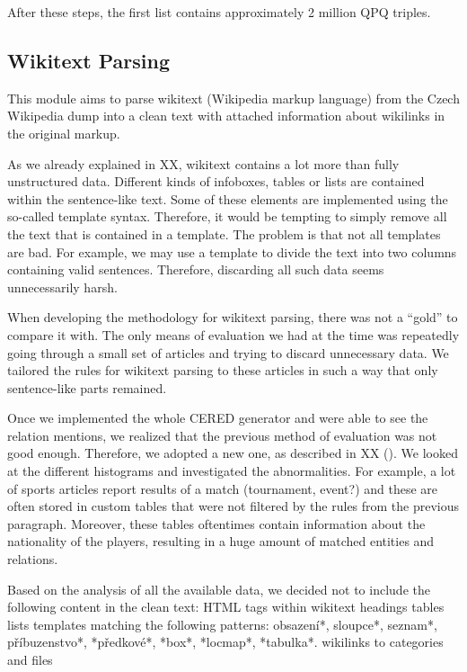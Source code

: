 After these steps, the first list contains approximately 2 million QPQ triples.

\subsection{Wikitext Parsing}

\label{sec:wikiperia_parsing_implementation}

This module aims to parse wikitext (Wikipedia markup language) from the Czech Wikipedia dump into a clean text with attached information about wikilinks in the original markup.

As we already explained in XX, wikitext contains a lot more than fully unstructured data. Different kinds of infoboxes, tables or lists are contained within the sentence-like text. Some of these elements are implemented using the so-called template syntax. Therefore, it would be tempting to simply remove all the text that is contained in a template. The problem is that not all templates are bad. For example, we may use a template to divide the text into two columns containing valid sentences. Therefore, discarding all such data seems unnecessarily harsh.

When developing the methodology for wikitext parsing, there was not a “gold” to compare it with. The only means of evaluation we had at the time was repeatedly going through a small set of articles and trying to discard unnecessary data. We tailored the rules for wikitext parsing to these articles in such a way that only sentence-like parts remained. 

Once we implemented the whole CERED generator and were able to see the relation mentions, we realized that the previous method of evaluation was not good enough. Therefore, we adopted a new one, as described in XX (). We looked at the different histograms and investigated the abnormalities. For example, a lot of sports articles report results of a match (tournament, event?) and these are often stored in custom tables that were not filtered by the rules from the previous paragraph. Moreover, these tables oftentimes contain information about the nationality of the players, resulting in a huge amount of matched entities and relations.

Based on the analysis of all the available data, we decided not to include the following content in the clean text:
HTML tags within wikitext
headings
tables
lists
templates matching the following patterns: obsazení*, sloupce*, seznam*, příbuzenstvo*, *předkové*, *box*, *locmap*, *tabulka*.
wikilinks to categories and files

